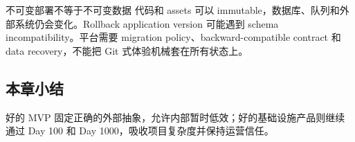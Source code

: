 \begin{warningbox}{不可变部署不等于不可变数据}
代码和 assets 可以 immutable，数据库、队列和外部系统仍会变化。Rollback application version 可能遇到 schema incompatibility。平台需要 migration policy、backward-compatible contract 和 data recovery，不能把 Git 式体验机械套在所有状态上。
\end{warningbox}

\subsection{本章小结}

好的 MVP 固定正确的外部抽象，允许内部暂时低效；好的基础设施产品则继续通过 Day 100 和 Day 1000，吸收项目复杂度并保持运营信任。

